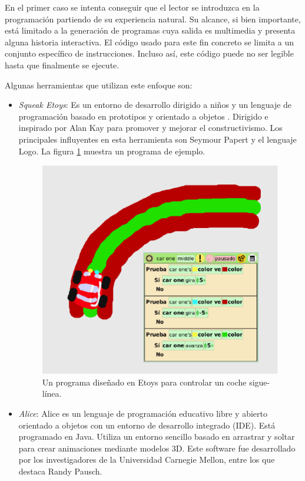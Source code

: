 \documentclass{llncs}
\begin{document}
En el primer caso se intenta conseguir que el lector se introduzca en la programación partiendo de su experiencia natural. Su alcance, si bien importante, está limitado a la generación de programas cuya salida es multimedia y presenta alguna historia interactiva. El código usado para este fin concreto se limita a un conjunto específico de instrucciones. Incluso así, este código puede no ser legible hasta que finalmente se ejecute. 

Algunas herramientas que utilizan este enfoque son:
\begin{itemize}
\item {\em Squeak Etoys}: Es un entorno de desarrollo dirigido a niños y un lenguaje de programación basado en prototipos y orientado a objetos \cite{etoysOnline}. Dirigido e inspirado por Alan Kay para promover y mejorar el constructivismo. Los principales influyentes en esta herramienta son Seymour Papert y el lenguaje Logo. La figura \ref{fig:etoys} muestra un programa de ejemplo.


\begin{figure}[ht]
\begin{center}
\includegraphics[scale=0.4]{images/etoys.eps}
\caption{Un programa diseñado en Etoys para controlar un coche sigue-línea.
\label{fig:etoys}}
\end{center}
\end{figure}

\item {\em Alice}: Alice \cite{AliceOnline} es un lenguaje de programación educativo libre y abierto orientado a objetos con un entorno de desarrollo integrado (IDE). Está programado en Java. Utiliza un entorno sencillo basado en arrastrar y soltar para crear animaciones mediante modelos 3D. Este software fue desarrollado por los investigadores de la Universidad Carnegie Mellon, entre los que destaca Randy Pausch.


\end{itemize}
\end{document}
